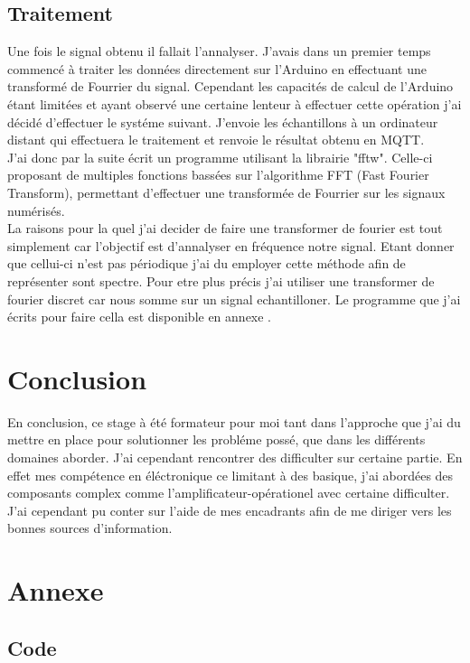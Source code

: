 \documentclass[12pt,french,a4paper]{article}
\begin{document}
\subsection{Traitement}

Une fois le signal obtenu il fallait l'annalyser. J'avais dans un premier temps commencé à traiter les données directement sur l'Arduino en effectuant une transformé de Fourrier du signal. Cependant les capacités de calcul de l'Arduino étant limitées et ayant observé une certaine lenteur à effectuer cette opération j'ai décidé d'effectuer le systéme suivant. J'envoie les échantillons à un ordinateur distant qui effectuera le traitement et renvoie le résultat obtenu en MQTT.\\
J'ai donc par la suite écrit un programme utilisant la librairie "fftw". Celle-ci proposant de multiples fonctions bassées sur l'algorithme FFT (Fast Fourier Transform), permettant d'effectuer une transformée de Fourrier sur les signaux numérisés.\\
La raisons pour la quel j'ai decider de faire une transformer de fourier est tout simplement car l'objectif est d'annalyser en fréquence notre signal. Etant donner que cellui-ci n'est pas périodique j'ai du employer cette méthode afin de représenter sont spectre. Pour etre plus précis j'ai utiliser une transformer de fourier discret car nous somme sur un signal echantilloner. 
Le programme que j'ai écrits pour faire cella est disponible en annexe .  


\newpage
\section{Conclusion}
En conclusion, ce stage à été formateur pour moi tant dans l'approche que j'ai du mettre en place pour solutionner les probléme possé, que dans les différents domaines aborder. J'ai cependant rencontrer des difficulter sur certaine partie. En effet mes compétence en éléctronique ce limitant à des basique, j'ai abordées des composants complex comme l'amplificateur-opérationel avec certaine difficulter. J'ai cependant pu conter sur l'aide de mes encadrants afin de me diriger vers les bonnes sources d'information.


\newpage
\listoffigures

\newpage
\section*{Annexe}
\subsection*{Code}
\end{document}

